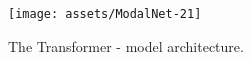 \begin{figure}
  \centering
  \texttt{[image: assets/ModalNet-21]}
  \caption{The Transformer - model architecture.}
  \label{fig:model-arch}
\end{figure}